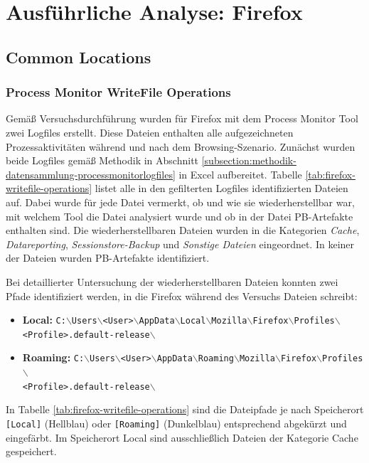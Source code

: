 \begin{appendices}
\begin{landscape}
\end{landscape}
\restoregeometry

\section{Ausführliche Analyse: Firefox}\label{section:appendix-firefox}
\subsection{Common Locations}
\label{subsection:appendix-firefox-common-locations}
\subsubsection*{Process Monitor WriteFile Operations}
\label{subsubsection:appendix-firefox-common-locations-writefile-operations}
Gemäß Versuchsdurchführung wurden für Firefox mit dem Process Monitor Tool zwei Logfiles erstellt. Diese Dateien enthalten alle aufgezeichneten Prozessaktivitäten während und nach dem Browsing-Szenario.
Zunächst wurden beide Logfiles gemäß Methodik in Abschnitt \ref{subsection:methodik-datensammlung-processmonitorlogfiles} in Excel aufbereitet. Tabelle \ref{tab:firefox-writefile-operations} listet alle in den gefilterten Logfiles identifizierten Dateien auf. Dabei wurde für jede Datei vermerkt, ob und wie sie wiederherstellbar war, mit welchem Tool die Datei analysiert wurde und ob in der Datei PB-Artefakte enthalten sind. Die wiederherstellbaren Dateien wurden in die Kategorien \textit{Cache}, \textit{Datareporting}, \textit{Sessionstore-Backup} und \textit{Sonstige Dateien} eingeordnet. In keiner der Dateien wurden PB-Artefakte identifiziert.

Bei detaillierter Untersuchung der wiederherstellbaren Dateien konnten zwei Pfade identifiziert werden, in die Firefox während des Versuchs Dateien schreibt: 
\begin{itemize}
\item \textbf{Local:} \texttt{C:$\backslash$Users$\backslash$<User>$\backslash$AppData$\backslash$Local$\backslash$Mozilla$\backslash$Firefox$\backslash$Profiles$\backslash$\\<Profile>.default-release$\backslash$}
\item \textbf{Roaming:} \texttt{C:$\backslash$Users$\backslash$<User>$\backslash$AppData$\backslash$Roaming$\backslash$Mozilla$\backslash$Firefox$\backslash$Profiles$\backslash$\\<Profile>.default-release$\backslash$}
\end{itemize}
In Tabelle 	\ref{tab:firefox-writefile-operations} sind die Dateipfade je nach Speicherort \texttt{[Local]} (Hellblau) oder \texttt{[Roaming]} (Dunkelblau) entsprechend abgekürzt und eingefärbt. Im Speicherort Local sind ausschließlich Dateien der Kategorie \glqq{}Cache\grqq{} gespeichert.


\end{appendices}
